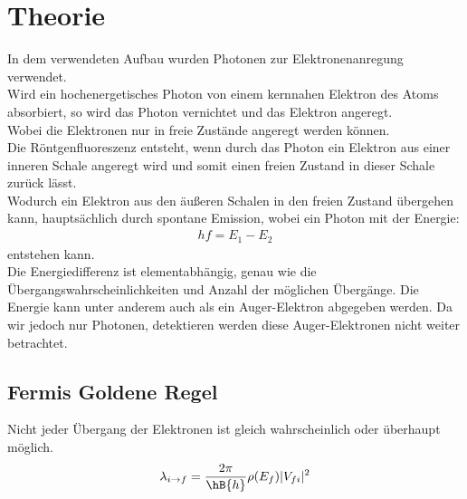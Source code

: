 \section{Theorie}
In dem verwendeten Aufbau wurden Photonen zur Elektronenanregung verwendet. \\
Wird ein hochenergetisches Photon von einem  kernnahen Elektron des Atoms absorbiert, so wird das Photon vernichtet und das Elektron angeregt. \\
Wobei die Elektronen nur in freie Zustände angeregt werden können. \\
Die Röntgenfluoreszenz entsteht, wenn durch das Photon ein Elektron aus einer inneren Schale angeregt wird und somit einen freien Zustand in dieser Schale zurück lässt. \\
Wodurch ein Elektron aus den äußeren Schalen in den freien Zustand übergehen kann, hauptsächlich durch spontane Emission, wobei ein Photon mit der Energie: \\

\begin{align}
    h f = E_{1} - E_{2}
\end{align}
entstehen kann.\\

Die Energiedifferenz ist elementabhängig, genau wie die Übergangswahrscheinlichkeiten und Anzahl der möglichen Übergänge.
Die Energie kann unter anderem auch als ein Auger-Elektron abgegeben werden. Da wir jedoch nur Photonen, detektieren werden diese Auger-Elektronen nicht weiter betrachtet.\\
\subsection{Fermis Goldene Regel}
Nicht jeder Übergang der Elektronen ist gleich wahrscheinlich oder überhaupt möglich. \\

\begin{align}
    \lambda_{i\rightarrow f} = \frac{2 \pi}{\hB{h}}\rho(E_{f}) \vert V_{f i} \vert ^{2}
\label{Eq:Fermi}
\end{align}

